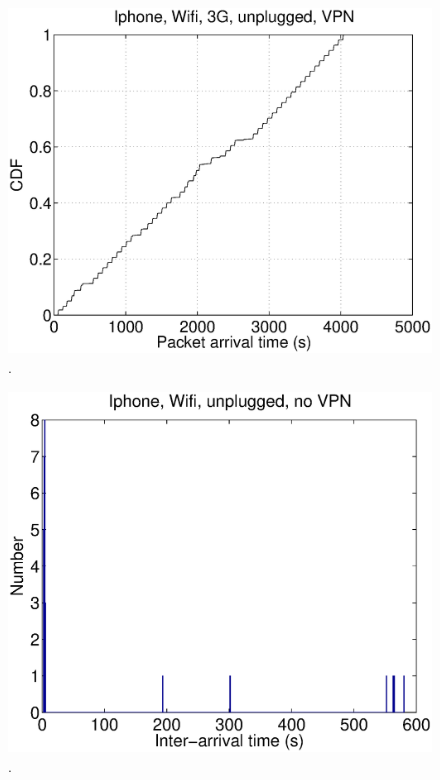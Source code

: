 \begin{figure}
\centering
        \includegraphics[width=0.8\linewidth]{../../code/pushNotification/Fig/bw_iphone_wifi_3g_unplug_vpn_ts.eps}
  \caption{.}
  \label{fig:}
\end{figure}

\begin{figure}
\centering
        \includegraphics[width=0.8\linewidth]{../../code/pushNotification/Fig/bw_iphone_wifi_unplug_novpn_interTs.eps}
  \caption{.}
  \label{fig:}
\end{figure}

